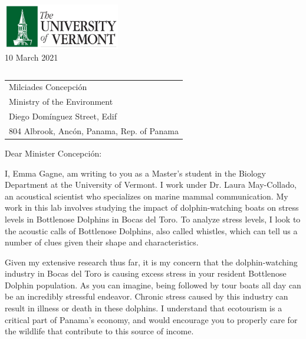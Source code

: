 \documentclass[10pt]{article}\usepackage[]{graphicx}\usepackage[]{color}
\begin{document}
\raggedright %
\includegraphics[scale=0.15,width=2in]{UVMLogo.jpg}\\ 

 \hfill\hfill\hfill %
 10 March 2021\\[10pt]  %
 
\begin{tabular}{l@{}}
\end{tabular}

\begin{tabular}{@{}l}
Milciades Concepción\\
Ministry of the Environment\\
Diego Domínguez Street, Edif\\
804 Albrook, Ancón, Panama, Rep. of Panama
\end{tabular}


Dear Minister Concepción:

I, Emma Gagne, am writing to you as a Master's student in the Biology Department at the University of Vermont. I work under Dr. Laura May-Collado, an acoustical scientist who specializes on marine mammal communication. My work in this lab involves studying the impact of dolphin-watching boats on stress levels in Bottlenose Dolphins in Bocas del Toro. To analyze stress levels, I look to the acoustic calls of Bottlenose Dolphins, also called whistles, which can tell us a number of clues given their shape and characteristics. 

Given my extensive research thus far, it is my concern that the dolphin-watching industry in Bocas del Toro is causing excess stress in your resident Bottlenose Dolphin population. As you can imagine, being followed by tour boats all day can be an incredibly stressful endeavor. Chronic stress caused by this industry can result in illness or death in these dolphins. I understand that ecotourism is a critical part of Panama's economy, and would encourage you to properly care for the wildlife that contribute to this source of income.
\end{document}
